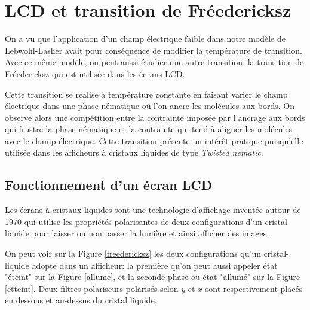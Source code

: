 \documentclass[11pt,a4paper]{article}
\numberwithin{equation}{section}
\begin{document}
\section{LCD et transition de Fréedericksz}
\label{lcd_partie}




On a vu que l'application d'un champ électrique faible dans notre modèle de Lebwohl-Lasher avait pour conséquence de modifier la température de transition. Avec ce même modèle, on peut aussi étudier une autre transition: la transition de Fréedericksz qui est utilisée dans les écrans LCD. 
\medskip

Cette transition se réalise à température constante en faisant varier le champ électrique dans une phase nématique où l'on ancre les molécules aux bords. On observe alors une compétition entre la contrainte imposée par l'ancrage aux bords qui frustre la phase nématique et la contrainte qui tend à aligner les molécules avec le champ électrique. Cette transition présente un intérêt pratique puisqu'elle utilisée dans les afficheurs à cristaux liquides de type \textit{Twisted nematic}.

\subsection{Fonctionnement d'un écran LCD}

Les écrans à cristaux liquides sont une technologie d'affichage inventée autour de 1970 qui utilise les propriétés polarisantes de deux configurations d'un cristal liquide pour laisser ou non passer la lumière et ainsi afficher des images. 
\medskip

On peut voir sur la Figure \ref{freedericksz} les deux configurations qu'un cristal-liquide adopte dans un afficheur: la première qu'on peut aussi appeler état "éteint" sur la Figure \ref{allume}, et la seconde phase ou état "allumé" sur la Figure \ref{etteint}. Deux filtres polariseurs polarisés selon $y$ et $x$ sont respectivement placés en dessous et au-dessus du cristal liquide.
\end{document}
